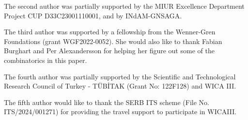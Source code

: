 \documentclass[12pt]{amsart}
\numberwithin{equation}{section}
\theoremstyle{definition}
\begin{document}
 
 
 The second author was partially supported by the MIUR Excellence Department Project CUP D33C23001110001, and by INdAM-GNSAGA. 

 The third author was supported by a fellowship from the Wenner-Gren Foundations (grant WGF2022-0052). She would also like to thank Fabian Burghart and Per Alexandersson for helping her figure out some of the combinatorics in this paper.

  The fourth author was partially supported by the Scientific and Technological Research Council of Turkey - TÜBİTAK (Grant No: 122F128) and WICA III.


The fifth author would like to thank the SERB ITS scheme (File No. ITS/2024/001271) for providing the travel support to participate in WICAIII.  
\end{document}
